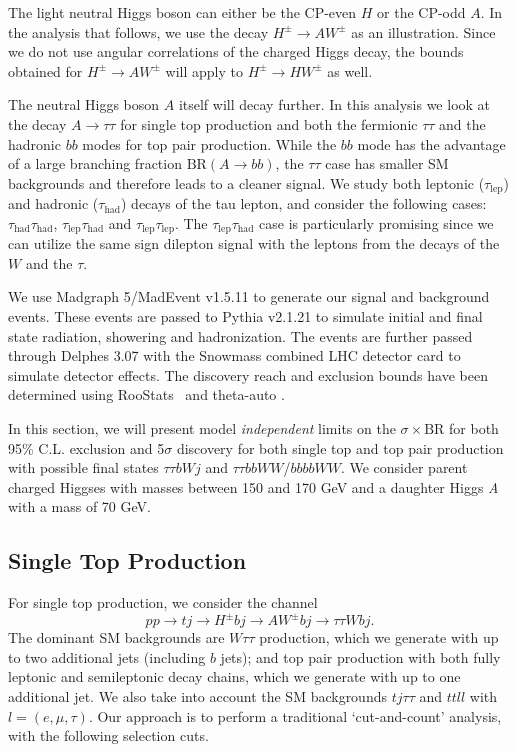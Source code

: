 The light neutral Higgs boson can either be the CP-even $H$ or the CP-odd $A$. In the analysis that follows, we use the decay $H^{\pm} \rightarrow A W^{\pm}$ as an illustration. Since we do not use angular correlations of the charged Higgs decay, the bounds obtained for $H^{\pm} \rightarrow A W^{\pm}$ will apply to $H^{\pm} \rightarrow H W^{\pm}$ as well.

The neutral Higgs boson $A$ itself will decay further. In this analysis we look at the decay $A \rightarrow\tau\tau$ for single top production and both the fermionic $\tau\tau$ and the hadronic $bb$ modes for top pair production. While the $bb$ mode has the advantage of a large branching fraction $\text{BR}(A \rightarrow bb)$, the $\tau\tau$ case has smaller SM backgrounds and therefore leads to a cleaner signal. We study both leptonic ($\tau_\text{lep}$) and hadronic ($\tau_\text{had}$) decays of the tau lepton, and consider the following cases: $\tau_\text{had}\tau_\text{had}$, $\tau_\text{lep}\tau_\text{had}$ and $\tau_\text{lep}\tau_\text{lep}$. The $\tau_\text{lep}\tau_\text{had}$ case is particularly promising since we can utilize the same sign dilepton signal with the leptons from the decays of the $W$ and the $\tau$. 

We use Madgraph 5/MadEvent v1.5.11 \cite{Alwall2014} to generate our signal and background events. These events are passed to Pythia v2.1.21 \cite{Sjostrand:2006za} to simulate initial and final state radiation, showering and hadronization. The events are further passed through Delphes 3.07 \cite{DeFavereau2014a} with the Snowmass combined LHC detector card \cite{Anderson:2013kxz} to simulate detector effects. The discovery reach and exclusion bounds have been determined using RooStats~\cite{Moneta:2010pm} and theta-auto \cite{thetaauto}. 

In this section, we will present model \emph{independent} limits on the $\sigma\times\text{BR}$ for both 95\% C.L. exclusion and 5$\sigma$ discovery for both single top and top pair production with possible final states $\tau\tau bW j$ and $\tau\tau bbWW$/$bbbbWW$. We consider parent charged Higgses with masses between 150 and 170 GeV and a daughter Higgs \emph{A} with a mass of 70 GeV. 

\subsection{Single Top Production}\label{subsec:light_charged_analysis_tj}
 
For single top production, we consider the channel
\[pp\rightarrow tj\rightarrow H^{\pm} bj\rightarrow AW^{\pm}bj \rightarrow \tau\tau W bj.\]
The dominant SM backgrounds are $W\tau\tau$ production, which we generate with up to two additional jets (including $b$ jets); and top pair production with both fully leptonic and semileptonic decay chains, which we generate with up to one additional jet. We also take into account the SM backgrounds $tj\tau\tau$ and $ttll$ with $l= (e, \mu, \tau)$. Our approach is to perform a traditional `cut-and-count' analysis, with the following selection cuts.

